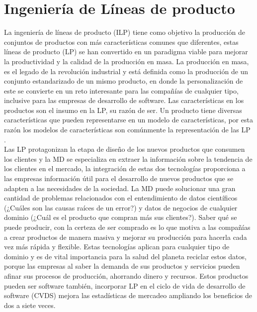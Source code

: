 \section{Ingeniería de Líneas de producto}

La ingeniería de líneas de producto (ILP) tiene como objetivo la producción de conjuntos de productos con más características comunes que diferentes, estas líneas de producto (LP) se han convertido en un paradigma viable para mejorar la productividad y la calidad de la producción en masa\cite{Benavides2010}. La producción en masa, es el legado de la revolución industrial y está definida como la producción de un conjunto estandarizado de un mismo producto, en donde la personalización de este se convierte en un reto interesante para las compañías de cualquier tipo, inclusive para las empresas de desarrollo de software. Las características en los productos son el insumo en la LP, su razón de ser. Un producto tiene diversas características que pueden representarse en un modelo de características, por esta razón los modelos de características son comúnmente la representación de las LP \cite{Simpson, Zhang2013,Zhou2015b}.\\

Las LP protagonizan la etapa de diseño de los nuevos productos que consumen los clientes y la MD se especializa en extraer la información sobre la tendencia de los clientes en el mercado, la integración de estas dos tecnologías proporciona a las empresas información útil para el desarrollo de nuevos productos que se adapten a las necesidades de la sociedad\cite{Bae2011,Lin2013}. La MD puede solucionar una gran cantidad de problemas relacionados con el entendimiento de datos científicos (¿Cuáles son las causas raíces de un error?) y datos de negocios de cualquier dominio (¿Cuál es el producto que compran más sus clientes?)\cite{Hornick2009,Bae2011}. Saber qué se puede producir, con la certeza de ser comprado es lo que motiva a las compañías a crear productos de manera masiva y mejorar su producción para hacerla cada vez más rápida y flexible\cite{Benavides2010}. Estas tecnologías aplican para cualquier tipo de dominio y es de vital importancia para la salud del planeta reciclar estos datos, porque las empresas al saber la demanda de sus productos y servicios pueden afinar sus procesos de producción, ahorrando dinero y recursos\cite{Lian2015}. Estos productos pueden ser software también, incorporar LP en el ciclo de vida de desarrollo de software (CVDS) mejora las estadísticas de mercadeo ampliando los beneficios de dos a siete veces\cite{Zhang2013}.

